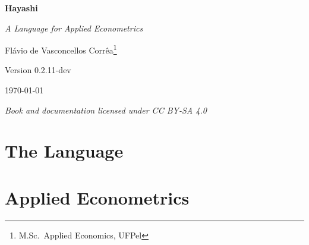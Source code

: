 \documentclass[12pt, a4paper, twoside, openright]{book}
\newcommand{\version}{0.2.11-dev}
\begin{document}
\begin{titlepage}
  \centering
  \vspace*{3cm}
  {\Huge\bfseries\color{hayblue} Hayashi \par}
  \vspace{0.5cm}
  {\large\itshape A Language for Applied Econometrics \par}
  \vspace{2cm}
  \renewcommand{\thefootnote}{\fnsymbol{footnote}}%
  {\large Flávio de Vasconcellos Corrêa\footnote{M.Sc.~Applied Economics, UFPel} \par}%
  \renewcommand{\thefootnote}{\arabic{footnote}}
  \vspace{1cm}
  {\normalsize Version \version{} \par}
  \vfill
  {\small \today \par}
  \vspace{0.5cm}
  {\small\itshape Book and documentation licensed under CC BY-SA 4.0 \par}
\end{titlepage}

\cleardoublepage

\frontmatter


\tableofcontents
\cleardoublepage

\mainmatter

\part{The Language}




















\part{Applied Econometrics}
\end{document}
